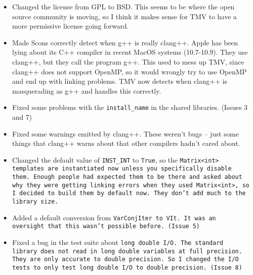 \begin{itemize}

\item Changed the license from GPL to BSD.  This seems to be where the open 
source community is moving, so I think it makes sense for TMV to have a 
more permissive license going forward.

\item
Made Scons correctly detect when g++ is really clang++.  Apple has been lying about
its C++ compiler in recent MacOS systems (10.7-10.9).  They use clang++,
but they call the program g++.  This used to mess up TMV, since clang++ 
does not support OpenMP, so it would wrongly try to use OpenMP and end up 
with linking problems.  TMV now detects when clang++ is masquerading as
g++ and handles this correctly.

\item
Fixed some problems with the \texttt{install\_name} in the shared libraries.  
(Issues 3 and 7)

\item
Fixed some warnings emitted by clang++.  These weren't bugs -- just some
things that clang++ warns about that other compilers hadn't cared about.

\item
Changed the default value of \texttt{INST\_INT} to \texttt{True}, so the \tt{Matrix<int>}
templates are instantiated now unless you specifically disable them.  Enough people
had expected them to be there and asked about why they were getting 
linking errors when they used \tt{Matrix<int>}, so I decided to build them
by default now.  They don't add much to the library size.

\item
Added a default conversion from \tt{VarConjIter} to \tt{VIt}.  It was an oversight
that this wasn't possible before.  (Issue 5)

\item 
Fixed a bug in the test suite about \tt{long double} I/O.  The standard library does
not read in \tt{long double} variables at full precision.  They are only accurate to
double precision.  So I changed the I/O tests to only test \tt{long double} I/O
to double precision.  (Issue 8)

\end{itemize}
